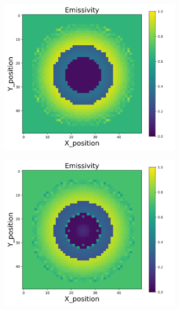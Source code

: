 {\begin{figure}[p]
\begin{minipage}{\textwidth}
\begin{subfigure}{0.325\textwidth}
        \end{subfigure}
    \end{minipage}\\
    \begin{minipage}{\textwidth}
        \centering
        \begin{subfigure}{0.325\textwidth}
            \centering
            \includegraphics[width=\textwidth]{figures/raw_data/22/linear/emi_cal.jpg}
        \end{subfigure}
        \begin{subfigure}{0.325\textwidth}
            \centering
            \includegraphics[width=\textwidth]{figures/raw_data/23/linear/emi_cal.jpg}

\end{subfigure}
\end{minipage}
\end{figure}}
